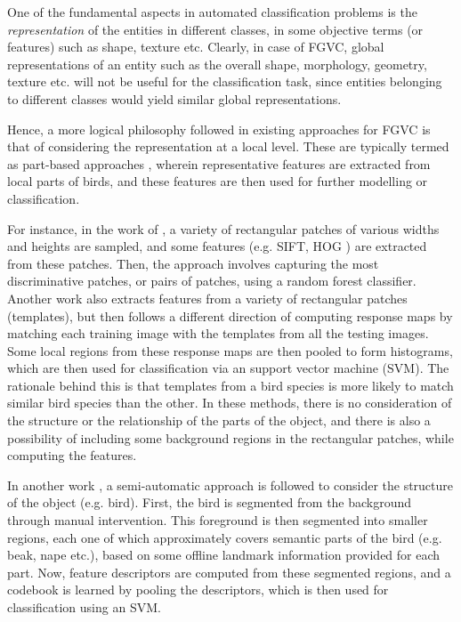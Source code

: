 \documentclass{article}
\begin{document}
One of the fundamental aspects in automated classification problems is the
\emph{representation} of the entities in different classes, in some objective
terms (or features) such as shape, texture etc. Clearly, in case of FGVC, global
representations of an entity such as the overall shape, morphology, geometry,
texture etc. will not be useful for the classification task, since entities
belonging to different classes would yield similar global representations. 

Hence, a more logical philosophy followed in existing approaches for FGVC is
that of considering the representation at a local level. These are typically
termed as part-based approaches \cite{dpm,hierarchy,poof,random,codebookfree},
wherein representative features are extracted from local parts of birds, and
these features are then used for further modelling or classification.  

For instance, in the work of \cite{random}, a variety of rectangular patches of
various widths and heights are sampled, and some features (e.g. SIFT, HOG
\cite{random,poof}) are extracted from these patches. Then, the approach
involves capturing the most discriminative patches, or pairs of patches, using a
random forest classifier. Another work \cite{codebookfree} also extracts
features from a variety of rectangular patches (templates), but then follows a
different direction of computing response maps by matching each training image
with the templates from all the testing images. Some local regions from these response
maps are then pooled to form histograms, which are then used for classification
via an support vector machine (SVM). The rationale behind this is that templates
from a bird species is more likely to match similar bird species than the other.
In these methods, there is no consideration of the structure or the relationship
of the parts of the object, and there is also a possibility of including some
background regions in the rectangular patches, while computing the features. 

In another work \cite{hierarchy}, a semi-automatic approach is followed to
consider the structure of the object (e.g. bird). First, the bird is segmented
from the background through manual intervention. This
foreground is then segmented into smaller regions, each one of which
approximately covers semantic parts of the bird (e.g. beak, nape etc.), based on
some offline landmark information provided for each part. Now, feature
descriptors are computed from these segmented regions, and a codebook is learned
by pooling the descriptors, which is then used for classification using an SVM.
     
\end{document}
